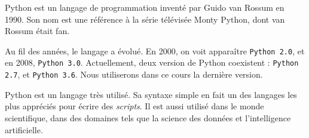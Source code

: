 Python est un langage de programmation inventé par Guido van Rossum en 1990. Son nom est une référence à la série télévisée Monty Python, dont van Rossum était fan.

Au fil des années, le langage a évolué. En 2000, on voit apparaître \texttt{Python 2.0}, et en 2008, \texttt{Python 3.0}.
Actuellement, deux version de Python coexistent : \texttt{Python 2.7}, et \texttt{Python 3.6}. Nous utiliserons dans ce cours la dernière version.

Python est un langage très utilisé. Sa syntaxe simple en fait un des langages les plus appréciés pour écrire des \textit{scripts}. Il est aussi utilisé dans le monde scientifique, dans des domaines tels que la science des données et l'intelligence artificielle.
